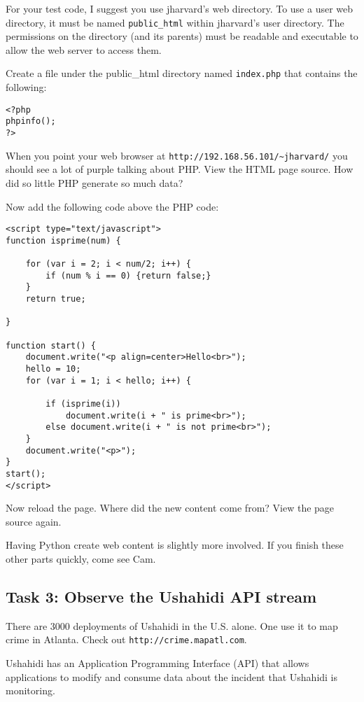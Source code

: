 \documentclass[letterpaper]{article}
\begin{document}
For your test code, I suggest you use jharvard's web directory.  To use a user web
directory, it must be named \lstinline{public_html} within jharvard's user
directory.  The permissions on the directory (and its parents) must be readable
and executable to allow the web server to access them.

Create a file under the public\_html directory named \lstinline{index.php} that contains the following:

\begin{lstlisting}
<?php
phpinfo();
?>
\end{lstlisting}

When you point your web browser at
\lstinline{http://192.168.56.101/~jharvard/} you should see a lot of purple
talking about PHP.  View the HTML page source.  How did so little PHP generate
so much data?

Now add the following code above the PHP code:

\begin{lstlisting}
<script type="text/javascript">
function isprime(num) {

    for (var i = 2; i < num/2; i++) {
        if (num % i == 0) {return false;}
    }
    return true;

}

function start() {
    document.write("<p align=center>Hello<br>");
    hello = 10;
    for (var i = 1; i < hello; i++) {
       
        if (isprime(i))
            document.write(i + " is prime<br>");
        else document.write(i + " is not prime<br>");
    }
    document.write("<p>");
}    
start();
</script>
\end{lstlisting}

Now reload the page.  Where did the new content come from?  View the page source again.

Having Python create web content is slightly more involved.  If you finish these other parts quickly, come see Cam.

\subsection*{Task 3: Observe the Ushahidi API stream}

There are 3000 deployments of Ushahidi in the U.S. alone.  One use it to map crime in Atlanta.  Check out \lstinline{http://crime.mapatl.com}.

Ushahidi has an Application Programming Interface (API) that allows
applications to modify and consume data about
the incident that Ushahidi is monitoring.
\end{document}
